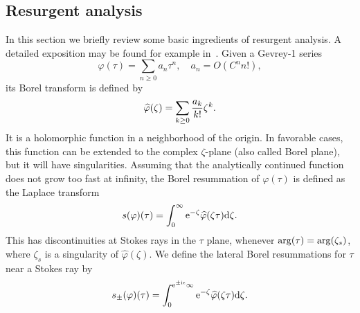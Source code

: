 \documentclass[12pt,reqno]{amsart}
\theoremstyle{definition}
\def\ri{\mathrm{i}}
\def\rd{\mathrm{d}}
\def\re{{\rm e}}
\def\ri{{\rm i}}
\def\rd{{\rm d}}
\begin{document}
\subsection{Resurgent analysis}
\label{sc:res}

In this section we briefly review some basic ingredients of resurgent
analysis. A detailed exposition may be found for example
in~\cite{abs,msauzin}. Given a Gevrey-1 series 
%
\begin{equation}
  \varphi(\tau)=\sum_{n \ge 0} a_n \tau^{n},\quad a_n = O(C^n n!),
\end{equation}
%
its Borel transform is defined by
%
\begin{equation}
  \widehat \varphi(\zeta)= \sum_{k \ge 0} {a_k \over k!} \zeta^k. 
\end{equation}
%
It is a holomorphic function in a neighborhood of the origin. In
favorable cases, this function can be extended to the complex
$\zeta$-plane (also called Borel plane), but it will have
singularities. Assuming that the analytically continued function does
not grow too fast at infinity, the Borel resummation of
$\varphi(\tau)$ is defined as the Laplace transform
%
\begin{equation}
  s(\varphi)(\tau) = \int_0^\infty \re^{-\zeta}
  \widehat \varphi(\zeta \tau) \rd \zeta. 
\end{equation}
%
This has discontinuities at Stokes rays in the $\tau$ plane, whenever
$ {\rm arg}(\tau)= {\rm arg}(\zeta_s)$, where $\zeta_s$ is a
singularity of $\widehat \varphi(\zeta)$. We define the lateral Borel
resummations for $\tau$ near a Stokes ray by
%
\begin{equation}
  s_\pm (\varphi)(\tau)= \int_0^{\re^{\pm \ri \epsilon} \infty}
  \re^{-\zeta} \widehat \varphi(\zeta \tau) \rd \zeta. 
\end{equation}
%
\end{document}
